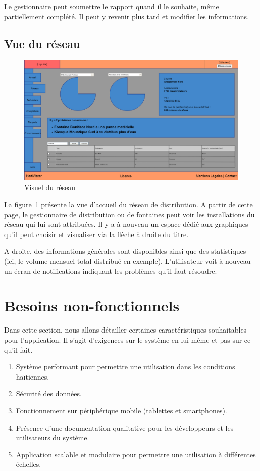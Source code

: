 \documentclass[a4paper, 11pt]{article}
\begin{document}
    Le gestionnaire peut soumettre le rapport quand il le souhaite, même partiellement complété. Il peut y revenir plus tard et modifier les informations.

  \subsection{Vue du réseau}
    \begin{figure}[H]
        \includegraphics[width=\textwidth]{Cahier_des_Charges/reseau}
        \caption{Visuel du réseau}
        \label{fig:network}
    \end{figure}
    La figure~\ref{fig:network} présente la vue d'accueil du réseau de distribution. A partir de cette page, le gestionnaire de distribution ou de fontaines peut voir les installations du réseau qui lui sont attribuées. Il y a à nouveau un espace dédié aux graphiques qu'il peut choisir et visualiser via la flèche à droite du titre.

    A droite, des informations générales sont disponibles ainsi que des statistiques (ici, le volume mensuel total distribué en exemple).
    L'utilisateur voit à nouveau un écran de notifications indiquant les problèmes qu'il faut résoudre.

\section{Besoins non-fonctionnels}
Dans cette section, nous allons détailler certaines caractéristiques souhaitables pour l'application. Il s'agit d'exigences sur le système en lui-même et pas sur ce qu'il fait.
\begin{enumerate}
  \item Système performant pour permettre une utilisation dans les conditions haïtiennes.
  \item Sécurité des données.
  \item Fonctionnement sur périphérique mobile (tablettes et smartphones).
  \item Présence d'une documentation qualitative pour les développeurs et les utilisateurs du système.
  \item Application scalable et modulaire pour permettre une utilisation à différentes échelles.
\end{enumerate}
\end{document}
